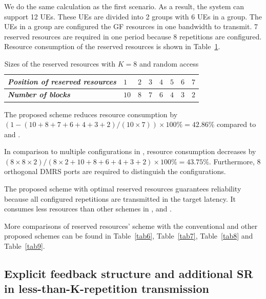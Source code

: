 \documentclass{ieeeaccess}
\begin{document}
We do the same calculation as the first scenario. As a result, the system can support 12 UEs. These UEs are divided into 2 groups with 6 UEs in a group. The UEs in a group are configured the GF resources in one bandwidth to transmit. 7 reserved resources are required in one period because 8 repetitions are configured. Resource consumption of the reserved resources is shown in Table~\ref{tab4}.

\begin{table}[htbp]
\caption{Sizes of the reserved resources with $K=8$ and random access}
\begin{center}
\begin{tabular}{|p{5em}|p{2em}|p{2em}|p{2em}|p{2em}|p{2em}|p{2em}|p{2em}|}
 \hline
 \textbf{\textit{Position of reserved resources}} & $1$ &$2$ &$3$ & $4$ &$5$ &$6$ &$7$\\ 
 \hline
 \textbf{\textit{Number of blocks}} & $10$ &$8$ &$7$ & $6$ &$4$ &$3$ &$2$\\

 
 \hline
\end{tabular}
\label{tab4}
\end{center}

\end{table}

The proposed scheme reduces resource consumption by $(1 - (10+8+7+6+4+3+2)/(10\times7)) \times100\% = 42.86\%$ compared to \cite{ref10} and \cite{ref11}.

In comparison to multiple configurations in \cite{ref7}, resource consumption decreases by $(8\times8\times2)/(8\times2+10+8+6+4+3+2)\times100\% = 43.75\%$. Furthermore, 8 orthogonal DMRS ports are required to distinguish the configurations.

The proposed scheme with optimal reserved resources guarantees reliability because all configured repetitions are transmitted in the target latency. It consumes less resources than other schemes in \cite{ref7}, \cite{ref10} and \cite{ref11}.

More comparisons of reserved resources' scheme with the conventional and other proposed schemes can be found in Table~\ref{tab6}, Table~\ref{tab7}, Table~\ref{tab8} and Table~\ref{tab9}.

\subsection{Explicit feedback structure and additional SR in less-than-K-repetition transmission}
\end{document}
